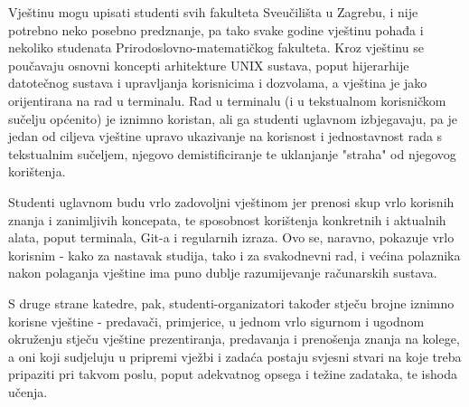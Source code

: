 \documentclass[12pt,a4paper,oneside]{article}
\begin{document}
Vještinu mogu upisati studenti svih fakulteta Sveučilišta u Zagrebu, i nije potrebno neko posebno predznanje, pa tako svake godine vještinu pohađa i nekoliko studenata Prirodoslovno-matematičkog fakulteta.
Kroz vještinu se poučavaju osnovni koncepti arhitekture UNIX sustava, poput hijerarhije datotečnog sustava i upravljanja korisnicima i dozvolama, a vještina je jako orijentirana na rad u terminalu. Rad u terminalu (i u tekstualnom korisničkom sučelju općenito) je iznimno koristan, ali ga studenti uglavnom izbjegavaju, pa je jedan od ciljeva vještine upravo ukazivanje na korisnost i jednostavnost rada s tekstualnim sučeljem, njegovo demistificiranje te uklanjanje "straha" od njegovog korištenja.

Studenti uglavnom budu vrlo zadovoljni vještinom jer prenosi skup vrlo korisnih znanja i zanimljivih koncepata, te sposobnost korištenja konkretnih i aktualnih alata, poput terminala, Git-a i regularnih izraza. Ovo se, naravno, pokazuje vrlo korisnim - kako za nastavak studija, tako i za svakodnevni rad, i većina polaznika nakon polaganja vještine ima puno dublje razumijevanje računarskih sustava.

S druge strane katedre, pak, studenti-organizatori također stječu brojne iznimno korisne vještine - predavači, primjerice, u jednom vrlo sigurnom i ugodnom okruženju stječu vještine prezentiranja, predavanja i prenošenja znanja na kolege, a oni koji sudjeluju u pripremi vježbi i zadaća postaju svjesni stvari na koje treba pripaziti pri takvom poslu, poput adekvatnog opsega i težine zadataka, te ishoda učenja.
\end{document}
